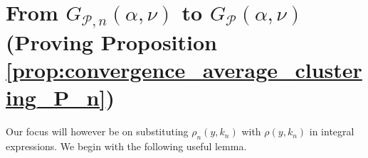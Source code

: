 \section{From $G_{\mathcal{P}, n}(\alpha, \nu)$ to $G_{\mathcal{P}}(\alpha, \nu)$ (Proving Proposition \ref{prop:convergence_average_clustering_P_n})}\label{sec:clustering_Pn_to_P}



Our focus will however be on substituting $\rho_n(y,k_n)$ with $\rho(y,k_n)$ in integral expressions. We begin with the following useful lemma. 

%
%
